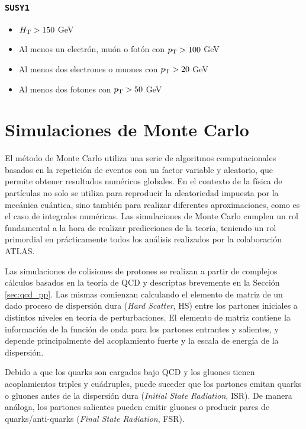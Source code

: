 \subsubsection{\texttt{SUSY1}}
\begin{itemize}

  \item $H_{\text{T}}>150$ GeV
  \item Al menos un electrón, muón o fotón con $p_{\text{T}}>100$ GeV
  \item Al menos dos electrones o muones con $p_{\text{T}}>20$ GeV
  \item Al menos dos fotones con $p_{\text{T}}>50$ GeV

\end{itemize}


\section{Simulaciones de Monte Carlo}


El método de Monte Carlo utiliza una serie de algoritmos computacionales basados en la repetición de eventos con un factor variable y aleatorio, que permite obtener resultados numéricos globales.
En el contexto de la física de partículas no solo se utiliza para reproducir la aleatoriedad impuesta por la mecánica cuántica, sino también para realizar diferentes aproximaciones, como es el caso de integrales numéricas.
Las simulaciones de Monte Carlo cumplen un rol fundamental a la hora de realizar predicciones de la teoría, teniendo un rol primordial en prácticamente todos los análisis realizados por la colaboración ATLAS. 

Las simulaciones de colisiones de protones se realizan a partir de complejos cálculos basados en la teoría de QCD y descriptas brevemente en la Sección \ref{sec:qcd_pp}. Las mismas comienzan calculando el elemento de matriz de un dado proceso de dispersión dura (\textit{Hard Scatter}, HS) entre los partones iniciales a distintos niveles en teoría de perturbaciones. El elemento de matriz contiene la información de la función de onda
para los partones entrantes y salientes, y depende principalmente del acoplamiento
fuerte y la escala de energía de la dispersión. 

Debido a que los quarks son cargados bajo QCD y los gluones tienen acoplamientos triples y cuádruples, puede suceder que los partones emitan quarks o gluones antes de la dispersión dura (\textit{Initial State Radiation}, ISR). De manera análoga, los partones salientes pueden emitir gluones o
producir pares de quarks/anti-quarks (\textit{Final State Radiation}, FSR). 

